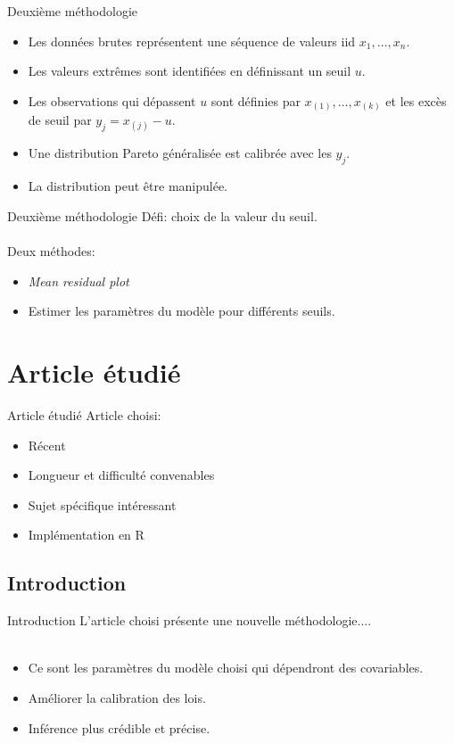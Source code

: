 \documentclass[aspectratio=169, 12pt, french]{beamer}
\begin{document}
\begin{frame}{Deuxième méthodologie}
\begin{itemize}
\item Les données brutes représentent une séquence de valeurs iid  $x_1,\dots,x_n$. \pause
\item Les valeurs extrêmes sont identifiées en définissant un seuil $u$. \pause
\item Les observations qui dépassent $u$ sont définies par $x_{(1)},\dots,x_{(k)}$ et les excès de seuil par $y_j = x_{(j)} - u$. \pause
\item Une distribution Pareto généralisée est calibrée avec les $y_j$. \pause
\item La distribution peut être manipulée.
\end{itemize}
\end{frame}

\begin{frame}{Deuxième méthodologie}
Défi: choix de la valeur du seuil. \\~\\ \pause
Deux méthodes:
\begin{itemize}
\item \textit{Mean residual plot}
\item Estimer les paramètres du modèle pour différents seuils.
\end{itemize}
\end{frame}


\section{Article étudié}

\begin{frame}{Article étudié}
Article choisi: \cite{chavez2016extreme}
\begin{itemize}
\item Récent
\item Longueur et difficulté convenables
\item Sujet spécifique intéressant
\item Implémentation en \textsf{R}
\end{itemize}
\end{frame}

\subsection{Introduction}
\begin{frame}{Introduction}
L'article choisi présente une nouvelle méthodologie....\\~\\  \pause
\begin{itemize}
\item Ce sont les paramètres du modèle choisi qui dépendront des covariables.\pause
\item Améliorer la calibration des lois. 
\item Inférence plus crédible et précise.
\end{itemize}
\end{frame}
\end{document}
